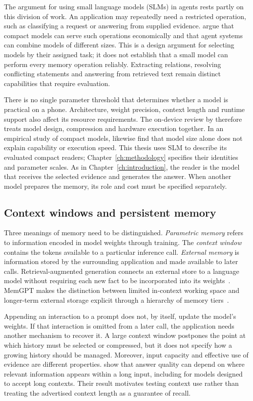 The argument for using small language models (SLMs) in agents rests partly on this division
of work. An application may repeatedly need a restricted operation, such as classifying a
request or answering from supplied evidence. \citet{slm_agentic} argue that compact models
can serve such operations economically and that agent systems can combine models of
different sizes. This is a design argument for selecting models by their assigned task;
it does not establish that a small model can perform every memory operation reliably.
Extracting relations, resolving conflicting statements and answering from retrieved text
remain distinct capabilities that require evaluation.

There is no single parameter threshold that determines whether a model is practical on a
phone. Architecture, weight precision, context length and runtime support also affect its
resource requirements. The on-device review by \citet{ondevice_lm_review} therefore treats
model design, compression and hardware execution together. In an empirical study of
compact models, \citet{slm_edge_deployment} likewise find that model size alone does not
explain capability or execution speed. This thesis uses SLM to describe its evaluated
compact readers; Chapter~\ref{ch:methodology} specifies their identities and parameter
scales. As in Chapter~\ref{ch:introduction}, the reader is the model that receives the
selected evidence and generates the answer. When another model prepares the memory, its
role and cost must be specified separately.

\subsection{Context windows and persistent memory}

Three meanings of memory need to be distinguished. \emph{Parametric memory} refers to
information encoded in model weights through training. The \emph{context window} contains
the tokens available to a particular inference call. \emph{External memory} is information
stored by the surrounding application and made available to later calls. Retrieval-augmented
generation connects an external store to a language model without requiring each
new fact to be incorporated into its weights~\citep{rag_lewis}. MemGPT makes the distinction
between limited in-context working space and longer-term external storage explicit through
a hierarchy of memory tiers~\citep{memgpt}.

Appending an interaction to a prompt does not, by itself, update the model's weights. If
that interaction is omitted from a later call, the application needs another mechanism to
recover it. A large context window postpones the point at which history must be selected
or compressed, but it does not specify how a growing history should be managed. Moreover,
input capacity and effective use of evidence are different properties. \citet{lost_in_middle}
show that answer quality can depend on where relevant information appears within a long
input, including for models designed to accept long contexts. Their result motivates
testing context use rather than treating the advertised context length as a guarantee of
recall.

